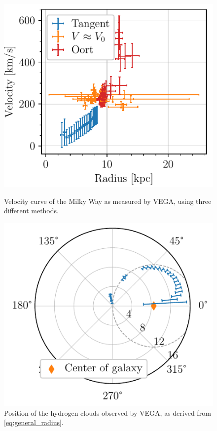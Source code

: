 \begin{figure}[htbp]
    \begin{minipage}[t]{0.5\textwidth}
        \centering
        \captionsetup{width=.95\textwidth}
        \includegraphics[scale=1]{figures/VEGA2_velocity_curve.pdf}
        \caption{Velocity curve of the Milky Way as measured by VEGA, using three different methods.}
        \label{fig:VEGA_velocity_curve}
    \end{minipage}
    \begin{minipage}[t]{0.5\textwidth}
        \centering
        \captionsetup{width=.95\textwidth}
        \includegraphics[scale=1]{figures/VEGA_galaxy_map.pdf}
        \caption{Position of the hydrogen clouds observed by VEGA, as derived from \autoref{eq:general_radius}.}
        \label{fig:VEGA_galaxy_map}
    \end{minipage}
\end{figure}


